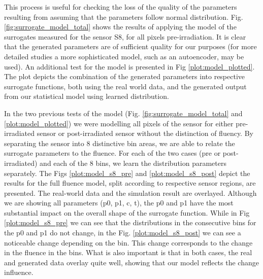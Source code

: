 This process is useful for checking the loss of the quality of the parameters resulting from assuming that the parameters follow normal distribution.
Fig. \ref{fig:surrogate_model_total} shows the results of applying the model of the surrogates measured for the sensor S8, for all pixels pre-irradiation. It is clear that the generated parameters are of sufficient quality for our purposes (for more detailed studies a more sophisticated model, such as an autoencoder, may be used).
An additional test for the model is presented in Fig \ref{plot:model_plotted}. The plot depicts the combination of the generated parameters into respective surrogate functions, both using the real world data, and the generated output from our statistical model using learned distribution.

In the two previous tests of the model (Fig. \ref{fig:surrogate_model_total} and \ref{plot:model_plotted}) we were modelling all pixels of the sensor for either pre-irradiated sensor or post-irradiated sensor without the distinction of fluency.
By separating the sensor into 8 distinctive bin areas, we are able to relate the surrogate parameters to the fluence.
For each of the two cases (pre or post-irradiated) and each of the 8 bins, we learn the distribution parameters separately.
The Figs \ref{plot:model_s8_pre} and \ref{plot:model_s8_post} depict the results for the full fluence model, split according to respective sensor regions, are presented. The real-world data and the simulation result are overlayed.
Although we are showing all parameters (p0, p1, c, t), the p0 and p1 have the most substantial impact on the overall shape of the surrogate function.
While in Fig \ref{plot:model_s8_pre} we can see that the distributions in the consecutive bins for the p0 and p1 do not change, in the Fig. \ref{plot:model_s8_post} we can see a noticeable change depending on the bin.
This change corresponds to the change in the fluence in the bins.
What is also important is that in both cases, the real and generated data overlay quite well, showing that our model reflects the change influence.

